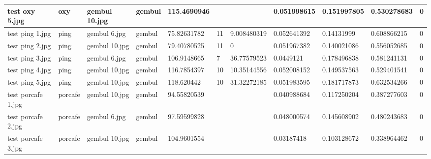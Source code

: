\begin{landscape}
\begin{longtable}{|p{2cm}|p{1.5cm}|p{2cm}|p{1.5cm}|p{2cm}|p{1cm}|p{2cm}|p{2cm}|p{2cm}|p{2cm}|p{1cm}|}
		test oxy 5.jpg       & oxy              & gembul 10.jpg         & gembul                      & 115.4690946           &                         &                            & 0.051998615           & 0.151997805           & 0.530278683              & 0                \\ \hline
		test ping 1.jpg      & ping             & gembul 6.jpg          & gembul                      & 75.82631782           & 11                      & 9.008480319                & 0.052641392           & 0.14131999            & 0.608866215              & 0                \\ \hline
		test ping 2.jpg      & ping             & gembul 10.jpg         & gembul                      & 79.40780525           & 11                      & 0                          & 0.051967382           & 0.140021086           & 0.556052685              & 0                \\ \hline
		test ping 3.jpg      & ping             & gembul 6.jpg          & gembul                      & 106.9148665           & 7                       & 36.77579523                & 0.0449121             & 0.178496838           & 0.581241131              & 0                \\ \hline
		test ping 4.jpg      & ping             & gembul 10.jpg         & gembul                      & 116.7854397           & 10                      & 10.35144556                & 0.052008152           & 0.149537563           & 0.529401541              & 0                \\ \hline
		test ping 5.jpg      & ping             & gembul 10.jpg         & gembul                      & 118.620442            & 10                      & 31.32272185                & 0.051983595           & 0.181717873           & 0.632534266              & 0                \\ \hline
		test porcafe 1.jpg   & porcafe          & gembul 10.jpg         & gembul                      & 94.55820539           &                         &                            & 0.040988684           & 0.117250204           & 0.387277603              & 0                \\ \hline
		test porcafe 2.jpg   & porcafe          & gembul 6.jpg          & gembul                      & 97.59599828           &                         &                            & 0.048000574           & 0.145608902           & 0.480243683              & 0                \\ \hline
		test porcafe 3.jpg   & porcafe          & gembul 10.jpg         & gembul                      & 104.9601554           &                         &                            & 0.03187418            & 0.103128672           & 0.338964462              & 0                \\ \hline

\end{longtable}
\end{landscape}
